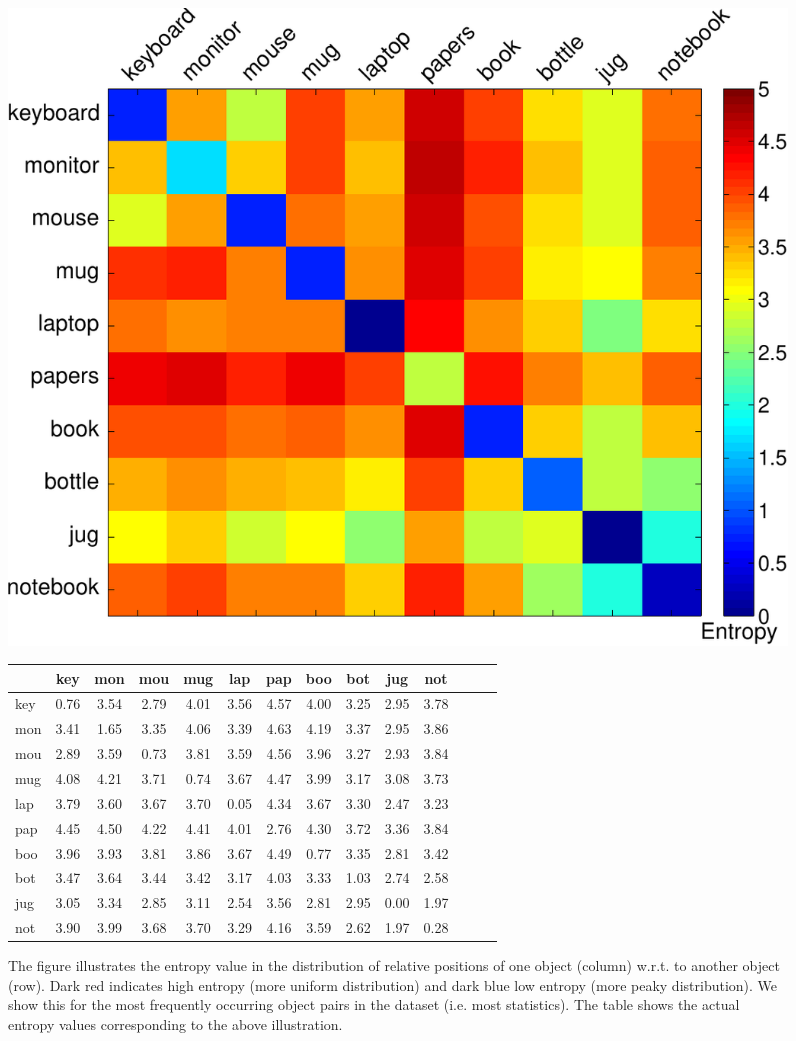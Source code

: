 \documentclass[letterpaper, 10 pt, conference]{ieeeconf}
\begin{document}
\begin{figure}
\begin{center}
\includegraphics[width=0.5\linewidth]{entropy_matrix-crop} \bigbreak
\begin{tabular}{|l||c|c|c|c|c|c|c|c|c|c|c|c|c|}
\hline
& key & mon & mou & mug & lap & pap & boo & bot & jug & not \\ \hline \hline
key & 0.76 & 3.54 & 2.79 & 4.01 & 3.56 & 4.57 & 4.00 & 3.25 & 2.95 & 3.78\\ \hline
mon & 3.41 & 1.65 & 3.35 & 4.06 & 3.39 & 4.63 & 4.19 & 3.37 & 2.95 & 3.86\\ \hline
mou & 2.89 & 3.59 & 0.73 & 3.81 & 3.59 & 4.56 & 3.96 & 3.27 & 2.93 & 3.84 \\ \hline
mug & 4.08 & 4.21 & 3.71 & 0.74 & 3.67 & 4.47 & 3.99 & 3.17 & 3.08 & 3.73 \\ \hline
lap & 3.79 & 3.60 & 3.67 & 3.70 & 0.05 & 4.34 & 3.67 & 3.30 & 2.47 & 3.23 \\ \hline
pap & 4.45 & 4.50 & 4.22 & 4.41 & 4.01 & 2.76 & 4.30 & 3.72 & 3.36 & 3.84 \\ \hline
boo & 3.96 & 3.93 & 3.81 & 3.86 & 3.67 & 4.49 & 0.77 & 3.35 & 2.81 & 3.42 \\ \hline
bot & 3.47 & 3.64 & 3.44 & 3.42 & 3.17 & 4.03 & 3.33 & 1.03 & 2.74 & 2.58 \\ \hline
jug & 3.05 & 3.34 & 2.85 & 3.11 & 2.54 & 3.56 & 2.81 & 2.95 & 0.00 & 1.97 \\ \hline
not & 3.90 & 3.99 & 3.68 & 3.70 & 3.29 & 4.16 & 3.59 & 2.62 & 1.97 & 0.28 \\ \hline
\end{tabular}\bigbreak
\caption{The figure illustrates the entropy value in the distribution of relative positions of one object (column) w.r.t. to another object (row). Dark red indicates high entropy (more uniform distribution) and dark blue low entropy (more peaky distribution). We show this for the most frequently occurring object pairs in the dataset (i.e. most statistics). The table shows the actual entropy values corresponding to the above illustration.}
\label{fig:entropy}
\end{center}
\end{figure}
\end{document}

